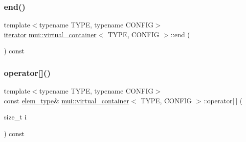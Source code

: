 \mbox{\label{classmui_1_1virtual__container_a62bfabdabdfbef922d63a4ffa72255a7}} 
\subsubsection{\texorpdfstring{end()}{end()}}
{\footnotesize\ttfamily template$<$typename T\+Y\+PE, typename C\+O\+N\+F\+IG$>$ \\
\hyperlink{classmui_1_1virtual__container_ab8a791b2f30b5a59f0bcc06b417d10fc}{iterator} \hyperlink{classmui_1_1virtual__container}{mui\+::virtual\+\_\+container}$<$ T\+Y\+PE, C\+O\+N\+F\+IG $>$\+::end (\begin{DoxyParamCaption}{ }\end{DoxyParamCaption}) const\hspace{0.3cm}{\ttfamily [inline]}}

\mbox{\label{classmui_1_1virtual__container_a6a56abd3edb58038f9223e3bd0c3d3fa}} 
\subsubsection{\texorpdfstring{operator[]()}{operator[]()}}
{\footnotesize\ttfamily template$<$typename T\+Y\+PE, typename C\+O\+N\+F\+IG$>$ \\
const \hyperlink{classmui_1_1virtual__container_a5539ad526cf676a5852858dd8da7eca2}{elem\+\_\+type}\& \hyperlink{classmui_1_1virtual__container}{mui\+::virtual\+\_\+container}$<$ T\+Y\+PE, C\+O\+N\+F\+IG $>$\+::operator\mbox{[}$\,$\mbox{]} (\begin{DoxyParamCaption}\item[{size\+\_\+t}]{i }\end{DoxyParamCaption}) const\hspace{0.3cm}{\ttfamily [inline]}}

\mbox{\label{classmui_1_1virtual__container_aedfdc7844490d780ba1770ee53a8b53c}} 
